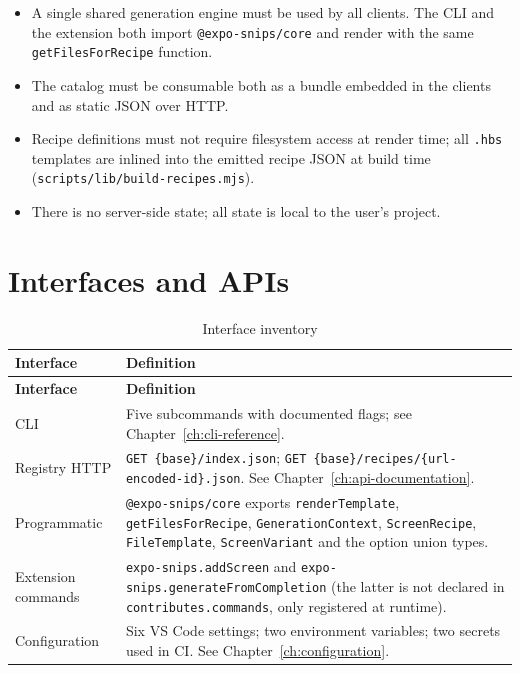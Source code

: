 \begin{itemize}
  \item A single shared generation engine must be used by all clients. The CLI and
        the extension both import \texttt{@expo-snips/core} and render with the
        same \texttt{getFilesForRecipe} function.
  \item The catalog must be consumable both as a bundle embedded in the clients and
        as static JSON over HTTP.
  \item Recipe definitions must not require filesystem access at render time; all
        \texttt{.hbs} templates are inlined into the emitted recipe JSON at build
        time (\texttt{scripts/lib/build-recipes.mjs}).
  \item There is no server-side state; all state is local to the user's project.
\end{itemize}

\section{Interfaces and APIs}

\begin{longtable}{@{}L{3.4cm}L{11cm}@{}}
\caption{Interface inventory}\\
\toprule
\textbf{Interface} & \textbf{Definition} \\
\midrule
\endfirsthead
\toprule
\textbf{Interface} & \textbf{Definition} \\
\midrule
\endhead
CLI & Five subcommands with documented flags; see Chapter~\ref{ch:cli-reference}. \\
Registry HTTP & \texttt{GET \{base\}/index.json};
\texttt{GET \{base\}/recipes/\{url-encoded-id\}.json}. See Chapter~\ref{ch:api-documentation}. \\
Programmatic & \texttt{@expo-snips/core} exports
\texttt{renderTemplate}, \texttt{getFilesForRecipe},
\texttt{GenerationContext}, \texttt{ScreenRecipe}, \texttt{FileTemplate},
\texttt{ScreenVariant} and the option union types. \\
Extension commands & \texttt{expo-snips.addScreen} and
\texttt{expo-snips.generateFromCompletion} (the latter is not declared in
\texttt{contributes.commands}, only registered at runtime). \\
Configuration & Six VS Code settings; two environment variables; two secrets used
in CI. See Chapter~\ref{ch:configuration}. \\
\bottomrule
\end{longtable}


